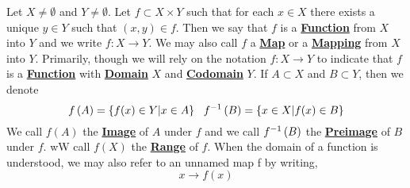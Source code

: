 \newcommand{\Function}[0]{\textbf{\hyperref[def:Function]{Function}}\xspace}
\newcommand{\Functions}[0]{\textbf{\hyperref[def:Function]{Functions}}\xspace}
\newcommand{\Map}[0]{\textbf{\hyperref[def:Function]{Map}}\xspace}
\newcommand{\Maps}[0]{\textbf{\hyperref[def:Function]{Maps}}\xspace}
\newcommand{\Mapping}[0]{\textbf{\hyperref[def:Function]{Mapping}}\xspace}
\newcommand{\Mappings}[0]{\textbf{\hyperref[def:Function]{Mappings}}\xspace}
\newcommand{\FunctionDomain}[0]{\textbf{\hyperref[def:Function]{Domain}}\xspace}
\newcommand{\FunctionDomains}[0]{\textbf{\hyperref[def:Function]{Domains}}\xspace}
\newcommand{\FunctionCodomain}[0]{\textbf{\hyperref[def:Function]{Codomain}}\xspace}
\newcommand{\FunctionCodomains}[0]{\textbf{\hyperref[def:Function]{Codomains}}\xspace}
\newcommand{\FunctionRange}[0]{\textbf{\hyperref[def:Function]{Range}}\xspace}
\newcommand{\FunctionRanges}[0]{\textbf{\hyperref[def:Function]{Ranges}}\xspace}
\newcommand{\FunctionImage}[0]{\textbf{\hyperref[def:Function]{Image}}\xspace}
\newcommand{\FunctionImages}[0]{\textbf{\hyperref[def:Function]{Images}}\xspace}
\newcommand{\FunctionPreimage}[0]{\textbf{\hyperref[def:Function]{Preimage}}\xspace}
\newcommand{\FunctionPreimages}[0]{\textbf{\hyperref[def:Function]{Preimages}}\xspace}
\begin{df}[Function]
\label{def:Function}

\rm
    Let $X \neq \emptyset$ 
    and $Y \neq \emptyset$.
    Let $f \subset X \times Y$ 
    such that for each $x \in X$ 
    there exists a unique $y \in Y$ 
    such that 
    $(x,y) \in f$. 
    Then we say that $f$ 
    is a \Function
    from $X$ into $Y$ 
    and we write 
    $f:X \to Y$. 
    We may also call $f$ 
    a 
    \Map
    or a 
    \Mapping 
    from $X$ 
    into $Y$. 
    Primarily, though 
    we will rely on the notation 
    $f:X \to Y$ to indicate
    that 
    $f$ is a 
    \Function
    with 
    \FunctionDomain
    $X$
    and 
    \FunctionCodomain
    $Y$.
    If $A \subset X$ 
    and $B \subset Y$, 
    then we denote 
    \begin{equation*}
    f\left( A\right)= \{f(x)\in Y | x \in A\} \\
    \; \; \;
    f^{-1}\left( B\right) = \{x \in X | f(x) \in B \}
    \end{equation*}
    We call 
    $f(A)$ 
    the \FunctionImage
    of $A$ under $f$
    and we call
    $f^{-1}\left( B\right)$ 
    the 
    \FunctionPreimage
    of $B$ under
    $f$. 
    wW call $f(X)$ 
    the \FunctionRange
    of $f$. 
    When the domain of a function is understood, we may also refer to an unnamed map
    f by writing, 
    \begin{equation*}
    x \to f(x)
    \end{equation*}
\end{df}

